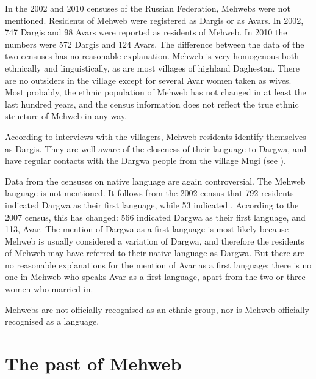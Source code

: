 \documentclass[output=paper]{langsci/langscibook}
\begin{document}
In the 2002 and 2010 censuses of the Russian Federation, Mehwebs were not
mentioned. Residents of Mehweb were registered as Dargis or as Avars. In
2002, 747 Dargis and 98 Avars were reported as residents of Mehweb. In
2010 the numbers were 572 Dargis and 124 Avars. The difference between
the data of the two censuses has no reasonable explanation. Mehweb is
very homogenous both ethnically and linguistically, as are most villages
of highland Daghestan. There are no outsiders in the village except for
several Avar women taken as wives. Most probably, the ethnic population
of Mehweb has not changed in at least the last hundred years, and the
census information does not reflect the true ethnic structure of Mehweb
in any way.

According to interviews with the villagers, Mehweb residents identify
themselves as Dargis. They are well aware of the closeness of their
language to Dargwa, and have regular contacts with the Dargwa people from
the village Mugi (see ).

Data from the censuses on native language are again controversial. The
Mehweb language is not mentioned. It follows from the 2002 census that
792 residents indicated Dargwa as their first language, while 53 indicated .
According to the 2007 census, this has changed: 566 indicated Dargwa as
their first language, and 113, Avar. The mention of Dargwa as a first language
is most likely because Mehweb is usually considered a variation of Dargwa, and
therefore the residents of Mehweb may have referred to their native
language as Dargwa. But there are no reasonable explanations for the
mention of Avar as a first language: there is no one in Mehweb who
speaks Avar as a first language, apart from the two or three women who
married in.

Mehwebs are not officially recognised as an ethnic group, nor is Mehweb
officially recognised as a language.

\section{The past of Mehweb}\label{the-past-of-mehweb}
\end{document}
